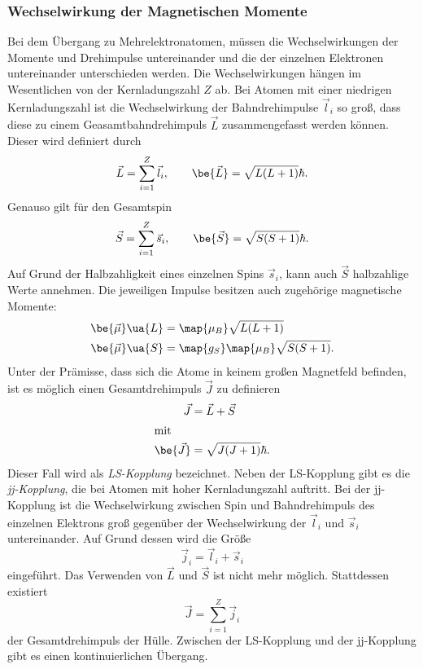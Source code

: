 \subsubsection{Wechselwirkung der Magnetischen Momente}

Bei dem Übergang zu Mehrelektronatomen, müssen die Wechselwirkungen der Momente und Drehimpulse untereinander und %
die der einzelnen Elektronen untereinander unterschieden werden. Die Wechselwirkungen hängen im Wesentlichen %
von der Kernladungszahl $Z$ ab.
Bei Atomen mit einer niedrigen Kernladungszahl ist die Wechselwirkung der Bahndrehimpulse $\vec{l}_i$ so groß, dass diese zu einem
Geasamtbahndrehimpuls $\vec{L}$ zusammengefasst werden können. Dieser wird definiert durch
\begin{equation*}
  \vec{L}=\sum_{i=1}^{Z} \vec{l}_i, \qquad \be{\vec{L}}=\sqrt{L(L+1)}\hbar.
\end{equation*}
Genauso gilt für den Gesamtspin
\begin{equation*}
  \vec{S}=\sum_{i=1}^{Z} \vec{s}_i, \qquad \be{\vec{S}}=\sqrt{S(S+1)}\hbar.
\end{equation*}
Auf Grund der Halbzahligkeit eines einzelnen Spins $\vec{s}_i$, kann auch $\vec{S}$ halbzahlige Werte annehmen.
Die jeweiligen Impulse besitzen auch zugehörige magnetische Momente:
\begin{align*}
  \be{\vec{\mu}}\ua{L}&=\map{\mu_B}\sqrt{L(L+1)}\\
  \be{\vec{\mu}}\ua{S}&=\map{g_S}\map{\mu_B}\sqrt{S(S+1)}.
\end{align*}
Unter der Prämisse, dass sich die Atome in keinem großen Magnetfeld befinden, ist es möglich einen Gesamtdrehimpuls $\vec{J}$ zu
definieren
\begin{align*}
  \vec{J}&=\vec{L}+\vec{S}\\
\shortintertext{mit}
\be{\vec{J}}&=\sqrt{J(J+1)}\hbar.
\end{align*}
Dieser Fall wird als \emph{LS-Kopplung} bezeichnet.
Neben der LS-Kopplung gibt es die \emph{jj-Kopplung}, die bei Atomen mit hoher Kernladungszahl auftritt.
Bei der jj-Kopplung ist die Wechselwirkung zwischen Spin und Bahndrehimpuls des einzelnen Elektrons groß gegenüber der Wechselwirkung der $\vec{l}_i$ und
$\vec{s}_i$ untereinander. Auf Grund dessen wird die Größe
\begin{equation*}
  \vec{j}_i=  \vec{l}_i+  \vec{s}_i
\end{equation*}
eingeführt. Das Verwenden von $\vec{L}$ und $\vec{S}$ ist nicht mehr möglich. %
Stattdessen existiert
\begin{equation*}
  \vec{J}=\sum_{i=1}^{Z} \vec{j}_i
\end{equation*}
der Gesamtdrehimpuls der Hülle.
Zwischen der LS-Kopplung und der jj-Kopplung gibt es einen kontinuierlichen Übergang. %

